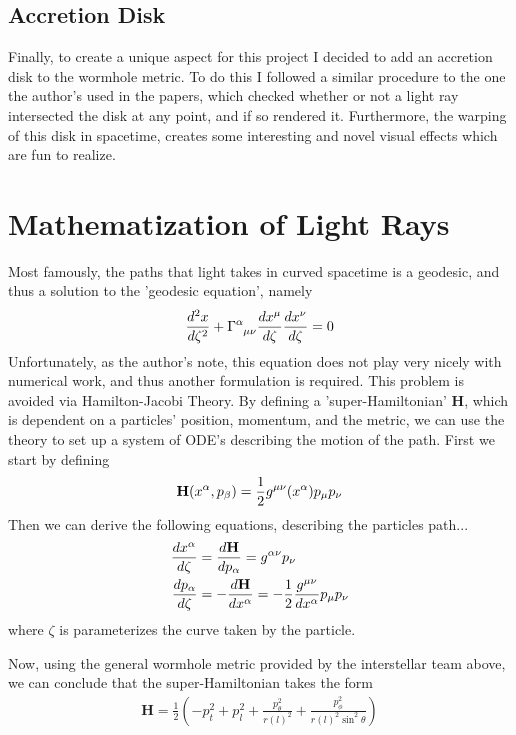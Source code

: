 \documentclass{article}
\begin{document}
\subsection{Accretion Disk}
Finally, to create a unique aspect for this project I decided to add an accretion disk to the wormhole metric. To do this I followed a similar procedure to the one the author's used in the papers, which checked whether or not a light ray intersected the disk at any point, and if so rendered it. Furthermore, the warping of this disk in spacetime, creates some interesting and novel visual effects which are fun to realize.
\section{Mathematization of Light Rays}
Most famously, the paths that light takes in curved spacetime is a geodesic, and thus a solution to the 'geodesic equation', namely
\begin{align*}
\frac{d^{2}x}{d\zeta^2} + \tensor{\Gamma}{^\alpha_\mu_\nu} \frac{dx^{\mu}}{d\zeta}\frac{dx^{\nu}}{d\zeta}= 0
\end{align*}
Unfortunately, as the author's note, this equation does not play very nicely with numerical work, and thus another formulation is required. This problem is avoided via Hamilton-Jacobi Theory. By defining a 'super-Hamiltonian' $\mathbf{H}$, which is dependent on a particles' position, momentum, and the metric, we can use the theory to set up a system of ODE's describing the motion of the path. First we start by defining
\begin{align*}
\mathbf{H}(x^{\alpha}, p_{\beta}) = \frac{1}{2} \tensor{g}{^\mu^\nu}(x^{\alpha})p_{\mu}p_{\nu}
\end{align*}
Then we can derive the following equations, describing the particles path...
\begin{align*}
\frac{dx^{\alpha}}{d\zeta} &= \frac{d\mathbf{H}}{dp_{\alpha}} = \tensor{g}{^\alpha^\nu}p_{\nu}\\
\frac{dp_{\alpha}}{d\zeta} &= -\frac{d\mathbf{H}}{dx^{\alpha}} = -\frac{1}{2}\frac{\tensor{g}{^\mu^\nu}}{dx^{\alpha}}   p_{\mu}p_{\nu}
\end{align*}
where $\zeta$ is parameterizes the curve taken by the particle.\par
Now, using the general wormhole metric provided by the interstellar team above, we can conclude that the super-Hamiltonian takes the form
\begin{align*}
\mathbf{H}=\frac{1}{2}(-p_{t}^2+p_{l}^2+\frac{p_{\theta}^{2}}{r(l)^2}+\frac{p_{\phi}^{2}}{r(l)^2\sin^2\theta})
\end{align*}
\end{document}
